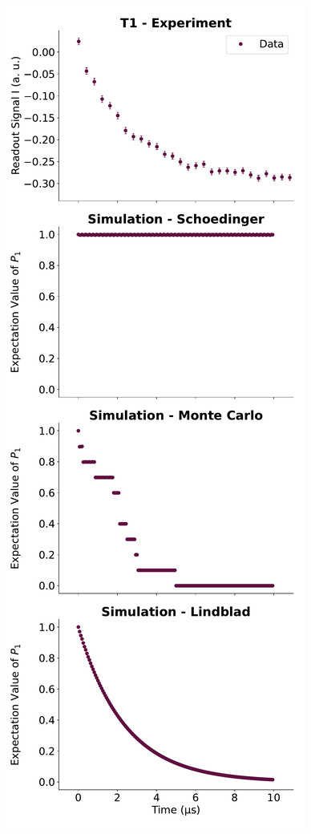 \begin{figure}[h]
    \begin{minipage}{0.45\textwidth}
        \centering
        \includegraphics[]{Simulations/simulations_of_calibrations/Figs/qubit_T1.pdf}

\end{minipage}
\end{figure}
